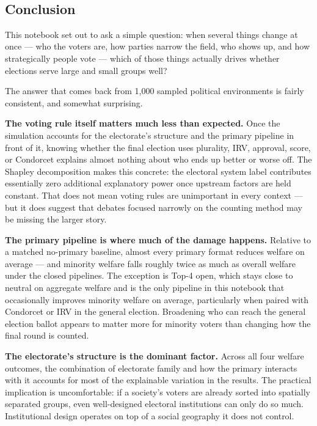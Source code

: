 \documentclass[11pt]{article}
\begin{document}
    \begin{center}
    \end{center}
    { \hspace*{\fill} \\}
    
    \subsection{Conclusion}\label{conclusion}

This notebook set out to ask a simple question: when several things
change at once --- who the voters are, how parties narrow the field, who
shows up, and how strategically people vote --- which of those things
actually drives whether elections serve large and small groups well?

The answer that comes back from 1,000 sampled political environments is
fairly consistent, and somewhat surprising.

\textbf{The voting rule itself matters much less than expected.} Once
the simulation accounts for the electorate's structure and the primary
pipeline in front of it, knowing whether the final election uses
plurality, IRV, approval, score, or Condorcet explains almost nothing
about who ends up better or worse off. The Shapley decomposition makes
this concrete: the electoral system label contributes essentially zero
additional explanatory power once upstream factors are held constant.
That does not mean voting rules are unimportant in every context --- but
it does suggest that debates focused narrowly on the counting method may
be missing the larger story.

\textbf{The primary pipeline is where much of the damage happens.}
Relative to a matched no-primary baseline, almost every primary format
reduces welfare on average --- and minority welfare falls roughly twice
as much as overall welfare under the closed pipelines. The exception is
Top-4 open, which stays close to neutral on aggregate welfare and is the
only pipeline in this notebook that occasionally improves minority
welfare on average, particularly when paired with Condorcet or IRV in
the general election. Broadening who can reach the general election
ballot appears to matter more for minority voters than changing how the
final round is counted.

\textbf{The electorate's structure is the dominant factor.} Across all
four welfare outcomes, the combination of electorate family and how the
primary interacts with it accounts for most of the explainable variation
in the results. The practical implication is uncomfortable: if a
society's voters are already sorted into spatially separated groups,
even well-designed electoral institutions can only do so much.
Institutional design operates on top of a social geography it does not
control.
\end{document}
